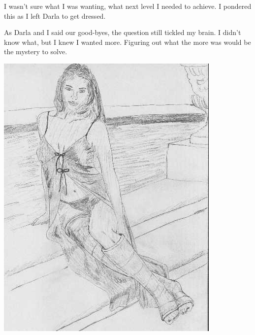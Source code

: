 I wasn't sure what I was wanting, what next level I needed to achieve. I pondered this as I
left Darla to get dressed.

As Darla and I said our good-byes, the question still tickled my brain. I didn't know what,
but I knew I wanted more. Figuring out what the more was would be the mystery to solve.

\begin{center}
\includegraphics{images/kicks13.jpg}
\end{center}
